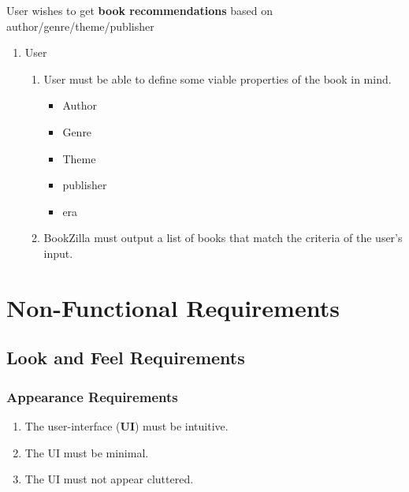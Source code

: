 \documentclass[12pt]{article}
\begin{document}
    
    User wishes to get \textbf{book recommendations} based on author/genre/theme/publisher 
        \begin{enumerate}[{VP1}.1]
            \item User
                \begin{enumerate}
                    \item User must be able to define some viable properties of the book in mind.
                    \begin{itemize}
                        \item Author
                        \item Genre
                        \item Theme
                        \item publisher
                        \item era
                    \end{itemize}
                    \item BookZilla must output a list of books that match the criteria of the user's input.
                \end{enumerate}
        \end{enumerate}
    
    
    \section{Non-Functional Requirements}
    \label{sec:non-functional_requirements}
    \subsection{Look and Feel Requirements}
    \label{sub:look_and_feel_requirements}
    
    \subsubsection{Appearance Requirements}
    \label{ssub:appearance_requirements}
    \begin{enumerate}[{LF}1. ]
        \item The user-interface (\textbf{UI}) must be intuitive.
        \item The UI must be minimal.
        \item The UI must not appear cluttered.
    \end{enumerate}
    
\end{document}
